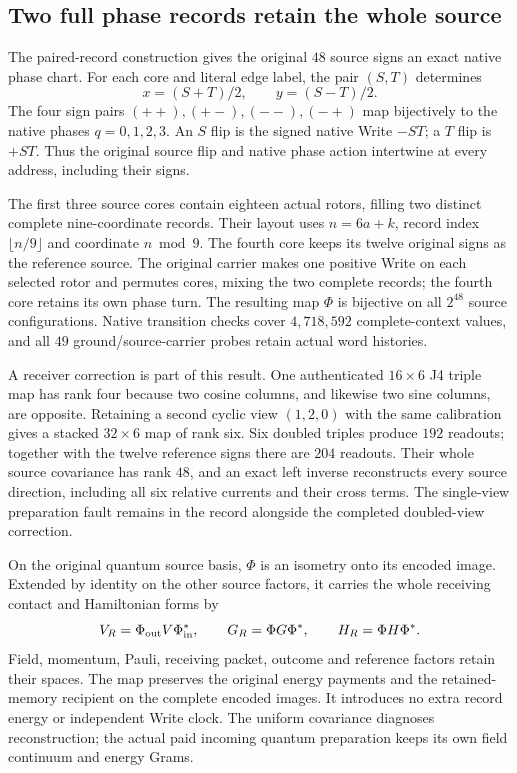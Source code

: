 \subsection{Two full phase records retain the whole source}

The paired-record construction gives the original $48$ source signs an exact native phase chart. For each core and literal edge label, the pair $(S,T)$ determines
\begin{equation}
 x=(S+T)/2,\qquad y=(S-T)/2.
\end{equation}
The four sign pairs $(++),(+-),(--),(-+)$ map bijectively to the native phases $q=0,1,2,3$. An $S$ flip is the signed native Write $-ST$; a $T$ flip is $+ST$. Thus the original source flip and native phase action intertwine at every address, including their signs.

The first three source cores contain eighteen actual rotors, filling two distinct complete nine-coordinate records. Their layout uses $n=6a+k$, record index $\lfloor n/9\rfloor$ and coordinate $n\bmod9$. The fourth core keeps its twelve original signs as the reference source. The original carrier makes one positive Write on each selected rotor and permutes cores, mixing the two complete records; the fourth core retains its own phase turn. The resulting map $\Phi$ is bijective on all $2^{48}$ source configurations. Native transition checks cover $4{,}718{,}592$ complete-context values, and all $49$ ground/source-carrier probes retain actual word histories.

A receiver correction is part of this result. One authenticated $16\times6$ J4 triple map has rank four because two cosine columns, and likewise two sine columns, are opposite. Retaining a second cyclic view $(1,2,0)$ with the same calibration gives a stacked $32\times6$ map of rank six. Six doubled triples produce $192$ readouts; together with the twelve reference signs there are $204$ readouts. Their whole source covariance has rank $48$, and an exact left inverse reconstructs every source direction, including all six relative currents and their cross terms. The single-view preparation fault remains in the record alongside the completed doubled-view correction.

On the original quantum source basis, $\Phi$ is an isometry onto its encoded image. Extended by identity on the other source factors, it carries the whole receiving contact and Hamiltonian forms by
\begin{equation}
 V_R=\Phi_{\rm out}V\Phi_{\rm in}^{*},\qquad
 G_R=\Phi G\Phi^{*},\qquad H_R=\Phi H\Phi^{*}.
\end{equation}
Field, momentum, Pauli, receiving packet, outcome and reference factors retain their spaces. The map preserves the original energy payments and the retained-memory recipient on the complete encoded images. It introduces no extra record energy or independent Write clock. The uniform covariance diagnoses reconstruction; the actual paid incoming quantum preparation keeps its own field continuum and energy Grams.

